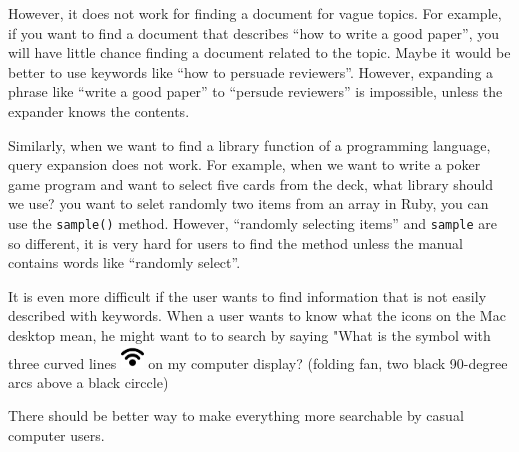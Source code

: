 \documentclass[manuscript,screen,review]{acmart}
\begin{document}
However, it does not work for finding a document for vague topics.
For example, if you want to find a document that describes ``how to write a good paper'',
you will have little chance finding a document related to the topic.
Maybe it would be better to use keywords like ``how to persuade reviewers''.
However, expanding a phrase like ``write a good paper'' to ``persude reviewers'' is impossible,
unless the expander knows the contents.


Similarly, 
when we want to find a library function of a programming language, query expansion does not work.
For example, when we want to write a poker game program and
want to select five cards from the deck, what library should we use?
you want to selet randomly two items from an array in Ruby,
you can use the \texttt{sample()} method.
However, ``randomly selecting items'' and \texttt{sample} are so different, it is very hard for users to
find the method unless the manual contains words like ``randomly select''.


It is even more difficult if the user wants to find information that is not easily described with keywords.
When a user wants to know what the icons on the Mac desktop mean, he might want to to 
search by saying "What is the symbol with three curved lines
\includegraphics[width=6mm,bb=0 0 225 225]{figures/fb2349ca17df1876178857566e7c68ef.png} %
on my computer display?
(folding fan, two black 90-degree arcs above a black circcle)


There should be better way to make everything more searchable by casual computer users.
\end{document}
